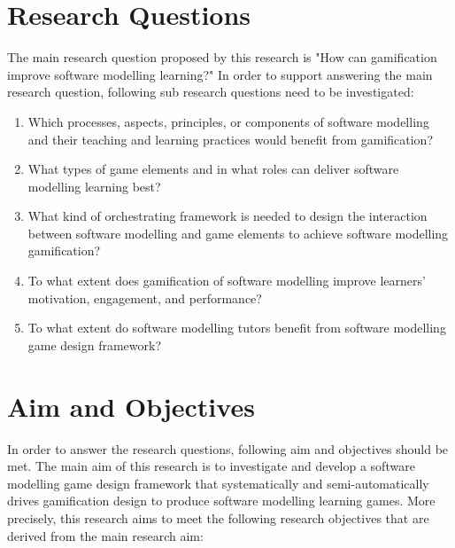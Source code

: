 \documentclass[a4paper]{Report}
\begin{document}
\section{Research Questions}
The main research question proposed by this research is "How can gamification improve software modelling learning?" In order to support answering the main research question, following sub research questions need to be investigated:
\begin{enumerate}
\item Which processes, aspects, principles, or components of software modelling and their teaching and learning practices would benefit from gamification?
\item What types of game elements and in what roles can deliver software modelling learning best? 
\item What kind of orchestrating framework is needed to design the interaction between software modelling and game elements to achieve software modelling gamification?
\item To what extent does gamification of software modelling improve learners' motivation, engagement, and performance?
\item To what extent do software modelling tutors benefit from software modelling game design framework?
\end{enumerate}

\section{Aim and Objectives}
In order to answer the research questions, following aim and objectives should be met. The main aim of this research is to investigate and develop a software modelling game design framework that systematically and semi-automatically drives gamification design to produce software modelling learning games. More precisely, this research aims to meet the following research objectives that are derived from the main research aim:
\end{document}
